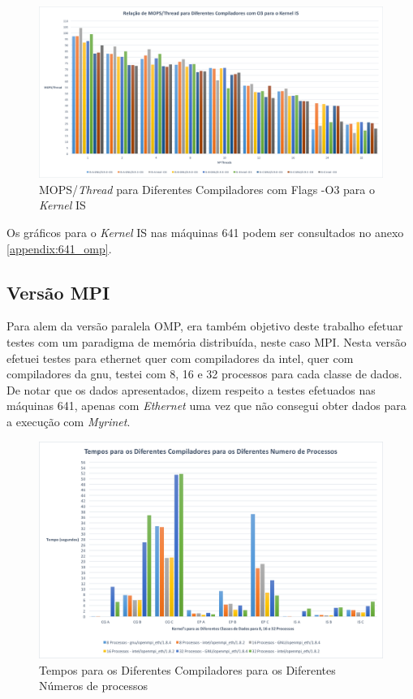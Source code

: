 \documentclass[conference,compsoc]{IEEEtran}
\begin{document}
\begin{figure}[h!]
\centering
\includegraphics[scale=0.225]{OMP/mops-thread_dif_comp-O3_IS_nodo-431.png}
\caption{MOPS/\textit{Thread} para Diferentes Compiladores com Flags -O3 para o \textit{Kernel} IS}
\label{fig:mops-thread_dif_comp_omp_O3_IS_431}
\end{figure}

Os gráficos para o \textit{Kernel} IS nas máquinas 641 podem ser consultados no anexo \ref{appendix:641_omp}.

\subsection{Versão MPI}
Para alem da versão paralela OMP, era também objetivo deste trabalho efetuar testes com um paradigma de memória distribuída, neste caso MPI. Nesta versão efetuei testes para ethernet quer com compiladores da intel, quer com compiladores da gnu, testei com 8, 16 e 32 processos para cada classe de dados. De notar que os dados apresentados, dizem respeito a testes efetuados nas máquinas 641, apenas com \textit{Ethernet} uma vez que não consegui obter dados para a execução com \textit{Myrinet}.

\begin{figure}[h!]
\centering
\includegraphics[scale=0.325]{MPI/tempos_dif_compiladores_dif_num_proc.png}
\caption{Tempos para os Diferentes Compiladores para os Diferentes Números de processos}
\label{fig:tempo_mpi_eth}
\end{figure}
\end{document}
